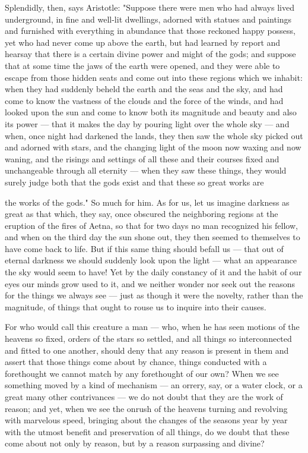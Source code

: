  Splendidly, then, says Aristotle: "Suppose there were men who had always lived underground, in fine and well-lit dwellings, adorned with statues and paintings and furnished with everything in abundance that those reckoned happy possess, yet who had never come up above the earth, but had learned by report and hearsay that there is a certain divine power and might of the gods; and suppose that at some time the jaws of the earth were opened, and they were able to escape from those hidden seats and come out into these regions which we inhabit: when they had suddenly beheld the earth and the seas and the sky, and had come to know the vastness of the clouds and the force of the winds, and had looked upon the sun and come to know both its magnitude and beauty and also its power — that it makes the day by pouring light over the whole sky — and when, once night had darkened the lands, they then saw the whole sky picked out and adorned with stars, and the changing light of the moon now waxing and now waning, and the risings and settings of all these and their courses fixed and unchangeable through all eternity — when they saw these things, they would surely judge both that the gods exist and that these so great works are

 the works of the gods." So much for him. As for us, let us imagine darkness as great as that which, they say, once obscured the neighboring regions at the eruption of the fires of Aetna, so that for two days no man recognized his fellow, and when on the third day the sun shone out, they then seemed to themselves to have come back to life. But if this same thing should befall us — that out of eternal darkness we should suddenly look upon the light — what an appearance the sky would seem to have! Yet by the daily constancy of it and the habit of our eyes our minds grow used to it, and we neither wonder nor seek out the reasons for the things we always see — just as though it were the novelty, rather than the magnitude, of things that ought to rouse us to inquire into their causes.

 For who would call this creature a man — who, when he has seen motions of the heavens so fixed, orders of the stars so settled, and all things so interconnected and fitted to one another, should deny that any reason is present in them and assert that those things come about by chance, things conducted with a forethought we cannot match by any forethought of our own? When we see something moved by a kind of mechanism — an orrery, say, or a water clock, or a great many other contrivances — we do not doubt that they are the work of reason; and yet, when we see the onrush of the heavens turning and revolving with marvelous speed, bringing about the changes of the seasons year by year with the utmost benefit and preservation of all things, do we doubt that these come about not only by reason, but by a reason surpassing and divine?

